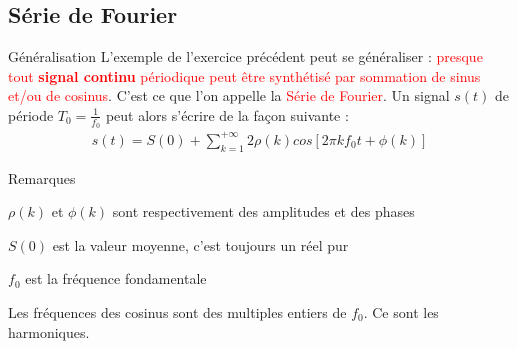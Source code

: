 \documentclass{beamer}
\begin{document}
\subsection{Série de Fourier} 
\begin{frame}
\begin{block}{Généralisation}
\justifying L'exemple de l'exercice précédent peut se généraliser  :
\textcolor{red}{presque tout \textbf{signal continu} périodique peut être
synthétisé par sommation de sinus et/ou de cosinus}. C'est ce que l'on appelle la \textcolor{red}{Série de Fourier}. Un signal $s(t)$ de
période $T_0 = \frac{1}{f_0}$ peut alors s'écrire de la façon suivante :
\begin{align*}
s(t) = S(0) + \sum_{k=1}^{+\infty} 2\rho (k) cos[2\pi kf_0t+\phi (k)]
\end{align*}
\end{block}
\pause
\begin{alertblock}{Remarques}
	\itemize
	\item $\rho(k)$ et $\phi(k)$ sont respectivement des amplitudes et des phases
	\pause
	\item $S(0)$ est la valeur moyenne, c'est toujours un réel pur
	\pause
	\item $f_0$ est la fréquence fondamentale 
	\pause
	\item Les fréquences des cosinus sont des multiples entiers de $f_0$. Ce sont
	les harmoniques.
\end{alertblock}
\end{frame}
\end{document}

